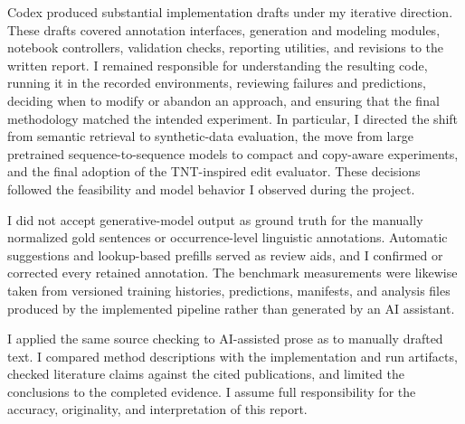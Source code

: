 \documentclass[12pt, a4paper, twoside, openany]{report}
\begin{document}
Codex produced substantial implementation drafts under my iterative direction. These drafts covered annotation interfaces, generation and modeling modules, notebook controllers, validation checks, reporting utilities, and revisions to the written report. I remained responsible for understanding the resulting code, running it in the recorded environments, reviewing failures and predictions, deciding when to modify or abandon an approach, and ensuring that the final methodology matched the intended experiment. In particular, I directed the shift from semantic retrieval to synthetic-data evaluation, the move from large pretrained sequence-to-sequence models to compact and copy-aware experiments, and the final adoption of the TNT-inspired edit evaluator. These decisions followed the feasibility and model behavior I observed during the project.

I did not accept generative-model output as ground truth for the manually normalized gold sentences or occurrence-level linguistic annotations. Automatic suggestions and lookup-based prefills served as review aids, and I confirmed or corrected every retained annotation. The benchmark measurements were likewise taken from versioned training histories, predictions, manifests, and analysis files produced by the implemented pipeline rather than generated by an AI assistant.

I applied the same source checking to AI-assisted prose as to manually drafted text. I compared method descriptions with the implementation and run artifacts, checked literature claims against the cited publications, and limited the conclusions to the completed evidence. I assume full responsibility for the accuracy, originality, and interpretation of this report.
\end{document}
